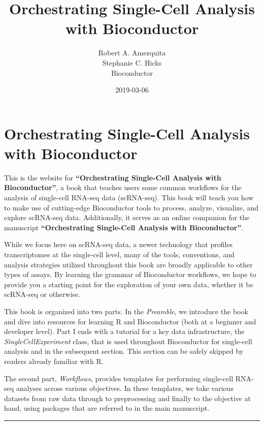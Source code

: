 \documentclass[]{book}
\title{Orchestrating Single-Cell Analysis with Bioconductor}
\author{Robert A. Amezquita \\ Stephanie C. Hicks \\ Bioconductor}
\date{2019-03-06}
\begin{document}
\maketitle

{
\setcounter{tocdepth}{1}
\tableofcontents
}
\hypertarget{orchestrating-single-cell-analysis-with-bioconductor}{%
\chapter*{Orchestrating Single-Cell Analysis with Bioconductor}\label{orchestrating-single-cell-analysis-with-bioconductor}}

This is the website for \textbf{``Orchestrating Single-Cell Analysis with Bioconductor''}, a book that teaches users some common workflows for the analysis of single-cell RNA-seq data (scRNA-seq). This book will teach you how to make use of cutting-edge Bioconductor tools to process, analyze, visualize, and explore scRNA-seq data. Additionally, it serves as an online companion for the manuscript \textbf{``Orchestrating Single-Cell Analysis with Bioconductor''}.

While we focus here on scRNA-seq data, a newer technology that profiles transcriptomes at the single-cell level, many of the tools, conventions, and analysis strategies utilized throughout this book are broadly applicable to other types of assays. By learning the grammar of Bioconductor workflows, we hope to provide you a starting point for the exploration of your own data, whether it be scRNA-seq or otherwise.

This book is organized into two parts. In the \emph{Preamble}, we introduce the book and dive into resources for learning R and Bioconductor (both at a beginner and developer level). Part I ends with a tutorial for a key data infrastructure, the \emph{SingleCellExperiment} class, that is used throughout Bioconductor for single-cell analysis and in the subsequent section. This section can be safely skipped by readers already familiar with R.

The second part, \emph{Workflows}, provides templates for performing single-cell RNA-seq analyses across various objectives. In these templates, we take various datasets from raw data through to preprocessing and finally to the objective at hand, using packages that are referred to in the main manuscript.

\begin{center}\rule{0.5\linewidth}{\linethickness}\end{center}
\end{document}
